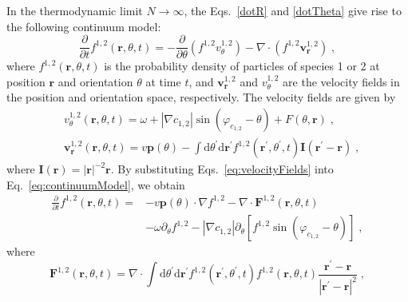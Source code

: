 \documentclass{article}
\begin{document}
In the thermodynamic limit $N\rightarrow \infty$, the Eqs.~\eqref{dotR} and \eqref{dotTheta} give rise to the following continuum model:
\begin{equation}
    \frac{\partial}{\partial t}f ^{1,2}\left( \mathbf{r},\theta ,t \right) =-\frac{\partial}{\partial \theta}\left( f ^{1,2}v_{\theta}^{1,2} \right) -\nabla \cdot \left( f ^{1,2}\mathbf{v}_{\mathbf{r}}^{1,2} \right) \;, \label{eq:continuumModel}
\end{equation}
where $f^{1,2}\left( \mathbf{r},\theta ,t \right)$ is the probability density of particles of species 1 or 2 at position $\mathbf{r}$ and orientation $\theta$ at time $t$, and $\mathbf{v}_{\mathbf{r}}^{1,2}$ and $v_{\theta}^{1,2}$ are the velocity fields in the position and orientation space, respectively. The velocity fields are given by
\begin{subequations}
    \begin{align}
        &v_{\theta}^{1,2}\left( \mathbf{r},\theta ,t \right) =\omega +\left| \nabla c_{1,2} \right|\sin \left( \varphi _{c_{1,2}} -\theta \right) +F\left( \theta ,\mathbf{r} \right)  \;,\\
        &\mathbf{v}_{\mathbf{r}}^{1,2}\left( \mathbf{r},\theta ,t \right) =v\mathbf{p}\left( \theta \right) -\int{\mathrm{d}\theta ^{\prime} \mathrm{d}\mathbf{r}^{\prime} f ^{1,2}\left( \mathbf{r}^{\prime} ,\theta ^{\prime} ,t \right) \mathbf{I}\left( \mathbf{r}^{\prime}-\mathbf{r} \right)} \;,
    \end{align}
    \label{eq:velocityFields}
\end{subequations}
where $\mathbf{I}\left( \mathbf{r} \right)=|\mathbf{r}|^{-2}\mathbf{r}$. By substituting Eqs.~\eqref{eq:velocityFields} into Eq.~\eqref{eq:continuumModel}, we obtain
\begin{equation}
    \begin{aligned}
        \frac{\partial}{\partial t}f ^{1,2}\left( \mathbf{r},\theta ,t \right) =&-v\mathbf{p}\left( \theta \right) \cdot \nabla f ^{1,2}-\nabla \cdot \mathbf{F}^{1,2}\left( \mathbf{r},\theta ,t \right) \\
        &-\omega \partial _{\theta}f ^{1,2}-\left| \nabla c_{1,2} \right|\partial _{\theta}\left[ f ^{1,2}\sin \left( \varphi _{c_{1,2}}-\theta \right) \right]\;,
    \end{aligned}
\end{equation}
where
\begin{equation}
    \mathbf{F}^{1,2}\left( \mathbf{r},\theta ,t \right)=\nabla \cdot \int{\mathrm{d}\theta ^{\prime}\mathrm{d}\mathbf{r}^{\prime}f^{1,2}\left( \mathbf{r}^{\prime},\theta ^{\prime},t \right) f^{1,2}\left( \mathbf{r},\theta ,t \right) \frac{\mathbf{r}^{\prime}-\mathbf{r}}{\left| \mathbf{r}^{\prime}-\mathbf{r} \right|^2}}\;,
\end{equation}
\end{document}
